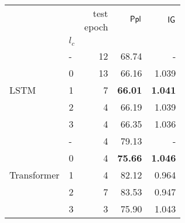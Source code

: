                 
\begin{tabular}{llrrr}
\toprule
                               &       & \makecell{test \\ epoch} & $\mathsf{Ppl}$ & $\mathsf{IG}$     \\
                               & $l_c$ &         &                 &                   \\
\midrule
\multirow{5}{*}{LSTM}         & - &          12 &  68.74          &       -           \\
                              & 0 &          13 &  66.16          &    1.039          \\
                              & 1 &           7 &  \textbf{66.01} &    \textbf{1.041} \\
                              & 2 &           4 &  66.19          &    1.039          \\
                              & 3 &           4 &  66.35          &    1.036          \\
\midrule
\multirow{5}{*}{Transformer}  & - &           4 &  79.13          &        -          \\
                              & 0 &           4 &  \textbf{75.66} &    \textbf{1.046} \\
                              & 1 &           4 &  82.12          &    0.964          \\
                              & 2 &           7 &  83.53          &    0.947          \\
                              & 3 &           3 &  75.90          &    1.043          \\
\bottomrule
\end{tabular}

